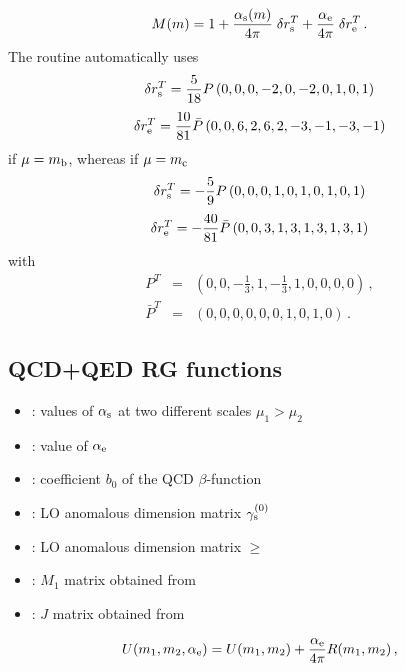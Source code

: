 \begin{equation}
M(m) = 1 + \frac{\alpha_{\mathrm s}(m)}{4\pi} \; \delta r_{\mathrm s}^T +
         \frac{\alpha_{\mathrm e}}{4\pi} \; \delta r_{\mathrm e}^T \, .
\label{eq:MmdF1:1010}
\end{equation}
The routine automatically uses
\begin{equation}\nonumber
\delta r_{\mathrm s}^T=\frac{5}{18} P \, (0,0,0,-2,0,-2,0,1,0,1)
\end{equation}
\begin{equation}
\delta r_{\mathrm e}^T=\frac{10}{81} \bar{P} \, (0,0,6,2,6,2,-3,-1,-3,-1)
\label{eq:drsembdF1:1010}
\end{equation}
if $\mu=m_{\mathrm b}$, whereas if  $\mu=m_{\mathrm c}$
\begin{equation}\nonumber
\delta r_{\mathrm s}^T=-\frac{5}{9} P \, (0,0,0,1,0,1,0,1,0,1)
\end{equation}
\begin{equation}
\delta r_{\mathrm e}^T=-\frac{40}{81} \bar{P} \, (0,0,3,1,3,1,3,1,3,1)
\label{eq:drsemcdF1:1010}
\end{equation}
with 
\begin{eqnarray}
P^T &=& (0,0,-\frac{1}{3},1,-\frac{1}{3},1,0,0,0,0) \, ,
\label{eq:Pdrs:10} \\
\bar{P}^T &=& (0,0,0,0,0,0,1,0,1,0) \, .
\label{eq:Pbardre:10}
\end{eqnarray}


\subsection{QCD+QED RG functions}


\begin{itemize}
\item {}: values of $\alpha_{\mathrm s}$ at two different scales $\mu_1>\mu_2$
\item {}: value of $\alpha_{\mathrm e}$
\item {}: coefficient $b_0$ of the QCD $\beta$-function
\item {}: LO anomalous dimension matrix $\gamma_{\mathrm s}^{(0)}$
\item {}: LO anomalous dimension matrix $\ge$
\item {}: $M_1$ matrix obtained from 
\item {}: $J$ matrix obtained from 
\end{itemize}

\begin{equation}
U(m_1,m_2,\alpha_{\mathrm e}) =
U(m_1,m_2) + \frac{\alpha_{\mathrm e}}{4\pi} R(m_1,m_2) \, ,
\label{eq:UdF1:1010}
\end{equation}


